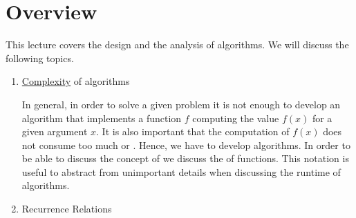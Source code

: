 \section{Overview}
This lecture covers the design and the analysis of algorithms.  We will discuss the following topics.
\begin{enumerate}

\item \href{http://en.wikipedia.org/wiki/Computational_complexity_theory}{Complexity}  of algorithms

      In general, in order to solve a given problem it is not enough to develop an algorithm that
      implements a function $f$ computing the  value $f(x)$ for a given argument $x$.  It is also important  
      that the computation of $f(x)$ does not consume too much  or .  Hence, we have
      to develop  algorithms.  In order to be able to discuss the concept of  
      we discuss the  of functions.  This notation is useful to abstract from
      unimportant details when discussing the runtime of algorithms.  
\item Recurrence Relations


\end{enumerate}
